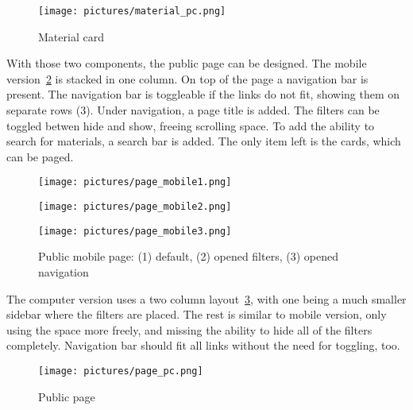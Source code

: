 \documentclass[
  digital,     %
  oneside,     %
  nosansbold,  %
  colorbold, %
  lof,         %
  lot,         %
]{fithesis4}
\begin{document}
\begin{figure}
	\begin{center}
		\begin{minipage}{1\textwidth}
			\texttt{[image: pictures/material\_pc.png]}
		\end{minipage}
	\end{center}
	\caption{Material card}
	\label{fig:mat-card-pc}
\end{figure}

With those two components, the public page can be designed. The mobile version~\ref{fig:page-mobile} is stacked in one column. On top of the page a navigation bar is present. The navigation bar is toggleable if the links do not fit, showing them on separate rows (3). Under navigation, a page title is added.  The filters can be toggled betwen hide and show, freeing scrolling space. To add the ability to search for materials, a search bar is added. The only item left is the cards, which can be paged.

\begin{figure}
	\begin{center}
		\begin{minipage}{.3\textwidth}
			\texttt{[image: pictures/page\_mobile1.png]}
		\end{minipage}
		\hfill
		\begin{minipage}{.3\textwidth}
			\texttt{[image: pictures/page\_mobile2.png]}
		\end{minipage}
		\hfill
		\begin{minipage}{.3\textwidth}
			\texttt{[image: pictures/page\_mobile3.png]}
		\end{minipage}
	\end{center}
	\caption{Public mobile page: (1) default, (2) opened filters, (3) opened navigation}
	\label{fig:page-mobile}
\end{figure}

The computer version uses a two column layout~\ref{fig:page-pc}, with one being a much smaller sidebar where the filters are placed. The rest is similar to mobile version, only using the space more freely, and missing the ability to hide all of the filters completely. Navigation bar should fit all links without the need for toggling, too.

\begin{figure}
	\begin{center}
		\begin{minipage}{.9\textwidth}
			\texttt{[image: pictures/page\_pc.png]}
		\end{minipage}
	\end{center}
	\caption{Public page}
	\label{fig:page-pc}
\end{figure}
\end{document}
